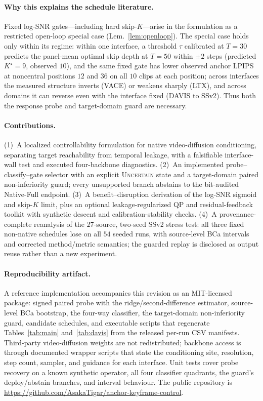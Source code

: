 \documentclass[letterpaper]{article}
\begin{document}
\paragraph{Why this explains the schedule literature.}
Fixed log-SNR gates---including hard skip-$K$---arise in the formulation as a
restricted open-loop special case (Lem.~\ref{lem:openloop}). The special
case holds only within its regime: within one interface, a threshold
$\tau$ calibrated at $T{=}30$ predicts the panel-mean optimal skip depth at
$T{=}50$ within $\pm2$ steps (predicted $K^\star{=}9$, observed $10$), and the same
fixed gate has lower observed anchor LPIPS at noncentral positions $12$
and $36$ on all $10$ clips at each position; across
interfaces the measured structure inverts (VACE) or weakens sharply (LTX),
and across domains it can reverse even with the interface fixed (DAVIS to
SSv2). Thus both the response probe and target-domain guard are necessary.

\paragraph{Contributions.}
(1)~A localized controllability formulation for native video-diffusion
conditioning, separating target reachability from temporal leakage, with a
falsifiable interface-wall test and executed four-backbone diagnostics.
(2)~An implemented probe--classify--gate selector with an explicit
\textsc{Uncertain} state and a target-domain paired non-inferiority guard;
every unsupported branch abstains to the bit-audited Native-Full endpoint.
(3)~A benefit--disruption derivation of the log-SNR sigmoid and skip-$K$
limit, plus an optional leakage-regularized QP and residual-feedback toolkit
with synthetic descent and calibration-stability checks.
(4)~A provenance-complete reanalysis of the $27$-source, two-seed SSv2
stress test: all three fixed non-native schedules lose on all $54$ seeded
runs, with source-level BCa intervals and corrected method/metric semantics;
the guarded replay is disclosed as output reuse rather than a new experiment.

\paragraph{Reproducibility artifact.}
A reference implementation accompanies this revision as an MIT-licensed
package: signed paired probe with the ridge/second-difference estimator,
source-level BCa bootstrap, the four-way classifier, the target-domain
non-inferiority guard, candidate schedules, and executable scripts that
regenerate Tables~\ref{tab:main} and~\ref{tab:davis} from the released
per-run CSV manifests. Third-party video-diffusion weights are not
redistributed; backbone access is through documented wrapper scripts
that state the conditioning site, resolution, step count, sampler, and
guidance for each interface. Unit tests cover probe recovery on a known
synthetic operator, all four classifier quadrants, the guard's
deploy/abstain branches, and interval behaviour. The public repository
is \url{https://github.com/AsakaTigar/anchor-keyframe-control}.
\end{document}
